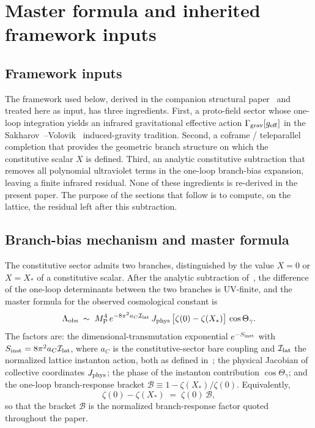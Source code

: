 \documentclass[a4paper,11pt]{article}
\theoremstyle{definition}
\newcommand{\MP}{M_{\rm P}}
\newcommand{\Lobs}{\Lambda_{\rm obs}}
\newcommand{\Ilat}{\mathcal{I}_{\rm lat}}
\newcommand{\Jphys}{J_{\rm phys}}
\newcommand{\Bobs}{\mathcal{B}}
\begin{document}
\section{Master formula and inherited framework inputs}
\label{sec:framework}

\subsection{Framework inputs}
\label{subsec:framework-inputs}

The framework used below, derived in the companion structural
paper~\cite{companion-structural} and treated here as input, has three
ingredients. First, a proto-field sector whose one-loop integration
yields an infrared gravitational effective action
$\Gamma_{\rm grav}[g_{\rm eff}]$ in the
Sakharov~\cite{Sakharov67,Visser02}--Volovik~\cite{Volovik03,Volovik2001}
induced-gravity tradition. Second, a coframe / teleparallel completion
that provides the geometric branch structure on which the constitutive
scalar $X$ is defined. Third, an analytic constitutive subtraction
that removes all polynomial ultraviolet terms in the one-loop
branch-bias expansion, leaving a finite infrared residual. None of
these ingredients is re-derived in the present paper. The purpose of
the sections that follow is to compute, on the lattice, the residual
left after this subtraction.

\subsection{Branch-bias mechanism and master formula}
\label{subsec:framework-master}

The constitutive sector admits two branches, distinguished by the
value $X = 0$ or $X = X_*$ of a constitutive scalar. After the
analytic subtraction of~\cite{companion-structural}, the difference of
the one-loop determinants between the two branches is UV-finite, and
the master formula for the observed cosmological constant is
\begin{equation}
\Lobs \;\sim\;
\MP^4\,
e^{-8\pi^2 a_C \Ilat}\,
\Jphys\,
\bigl[\zeta(0) - \zeta(X_*)\bigr]\,
\cos\Theta_\gamma .
\label{eq:master}
\end{equation}
The factors are: the dimensional-transmutation exponential
$e^{-S_{\rm inst}}$ with $S_{\rm inst} = 8\pi^2 a_C \Ilat$, where
$a_C$ is the constitutive-sector bare coupling and $\Ilat$ the
normalized lattice instanton action, both as defined
in~\cite{companion-structural}; the physical Jacobian of collective
coordinates $\Jphys$; the phase of the instanton contribution
$\cos\Theta_\gamma$; and the one-loop branch-response bracket
$\Bobs \equiv 1 - \zeta(X_*)/\zeta(0)$. Equivalently,
\[
\zeta(0) - \zeta(X_*) \;=\; \zeta(0)\,\Bobs ,
\]
so that the bracket $\Bobs$ is the normalized branch-response factor
quoted throughout the paper.
\end{document}
